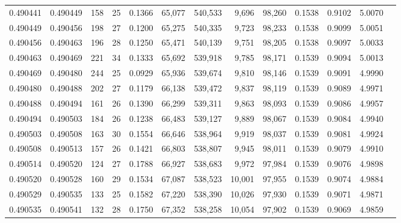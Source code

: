 \begin{tabular}{rrrrrrrrrrrrr}
0.490441 & 0.490449 & 158 &  25 &                                     0.1366 &  65,077 & 540,533 &   9,696 &  98,260 & 0.1538 & 0.9102 & 5.0070 \\
0.490449 & 0.490456 & 198 &  27 &                                     0.1200 &  65,275 & 540,335 &   9,723 &  98,233 & 0.1538 & 0.9099 & 5.0051 \\
0.490456 & 0.490463 & 196 &  28 &                                     0.1250 &  65,471 & 540,139 &   9,751 &  98,205 & 0.1538 & 0.9097 & 5.0033 \\
0.490463 & 0.490469 & 221 &  34 &                                     0.1333 &  65,692 & 539,918 &   9,785 &  98,171 & 0.1539 & 0.9094 & 5.0013 \\
0.490469 & 0.490480 & 244 &  25 &                                     0.0929 &  65,936 & 539,674 &   9,810 &  98,146 & 0.1539 & 0.9091 & 4.9990 \\
0.490480 & 0.490488 & 202 &  27 &                                     0.1179 &  66,138 & 539,472 &   9,837 &  98,119 & 0.1539 & 0.9089 & 4.9971 \\
0.490488 & 0.490494 & 161 &  26 &                                     0.1390 &  66,299 & 539,311 &   9,863 &  98,093 & 0.1539 & 0.9086 & 4.9957 \\
0.490494 & 0.490503 & 184 &  26 &                                     0.1238 &  66,483 & 539,127 &   9,889 &  98,067 & 0.1539 & 0.9084 & 4.9940 \\
0.490503 & 0.490508 & 163 &  30 &                                     0.1554 &  66,646 & 538,964 &   9,919 &  98,037 & 0.1539 & 0.9081 & 4.9924 \\
0.490508 & 0.490513 & 157 &  26 &                                     0.1421 &  66,803 & 538,807 &   9,945 &  98,011 & 0.1539 & 0.9079 & 4.9910 \\
0.490514 & 0.490520 & 124 &  27 &                                     0.1788 &  66,927 & 538,683 &   9,972 &  97,984 & 0.1539 & 0.9076 & 4.9898 \\
0.490520 & 0.490528 & 160 &  29 &                                     0.1534 &  67,087 & 538,523 &  10,001 &  97,955 & 0.1539 & 0.9074 & 4.9884 \\
0.490529 & 0.490535 & 133 &  25 &                                     0.1582 &  67,220 & 538,390 &  10,026 &  97,930 & 0.1539 & 0.9071 & 4.9871 \\
0.490535 & 0.490541 & 132 &  28 &                                     0.1750 &  67,352 & 538,258 &  10,054 &  97,902 & 0.1539 & 0.9069 & 4.9859 \\

\end{tabular}
